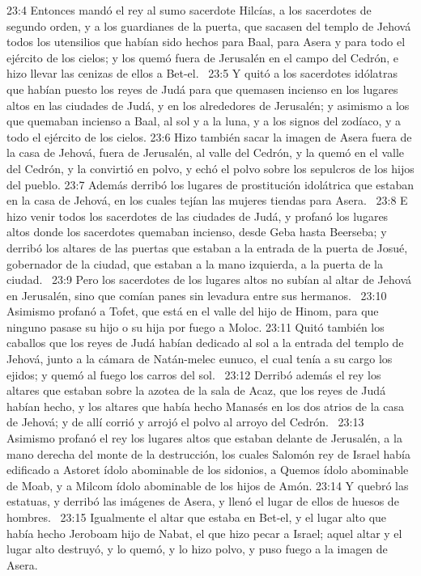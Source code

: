 23:4 Entonces mandó el rey al sumo sacerdote Hilcías, a los sacerdotes de segundo orden, y a los guardianes de la puerta, que sacasen del templo de Jehová todos los utensilios que habían sido hechos para Baal, para Asera y para todo el ejército de los cielos; y los quemó fuera de Jerusalén en el campo del Cedrón, e hizo llevar las cenizas de ellos a Bet-el.  
23:5 Y quitó a los sacerdotes idólatras que habían puesto los reyes de Judá para que quemasen incienso en los lugares altos en las ciudades de Judá, y en los alrededores de Jerusalén; y asimismo a los que quemaban incienso a Baal, al sol y a la luna, y a los signos del zodíaco, y a todo el ejército de los cielos. 
23:6 Hizo también sacar la imagen de Asera fuera de la casa de Jehová, fuera de Jerusalén, al valle del Cedrón, y la quemó en el valle del Cedrón, y la convirtió en polvo, y echó el polvo sobre los sepulcros de los hijos del pueblo. 
23:7 Además derribó los lugares de prostitución idolátrica que estaban en la casa de Jehová, en los cuales tejían las mujeres tiendas para Asera.  
23:8 E hizo venir todos los sacerdotes de las ciudades de Judá, y profanó los lugares altos donde los sacerdotes quemaban incienso, desde Geba hasta Beerseba; y derribó los altares de las puertas que estaban a la entrada de la puerta de Josué, gobernador de la ciudad, que estaban a la mano izquierda, a la puerta de la ciudad.  
23:9 Pero los sacerdotes de los lugares altos no subían al altar de Jehová en Jerusalén, sino que comían panes sin levadura entre sus hermanos.  
23:10 Asimismo profanó a Tofet, que está en el valle del hijo de Hinom, para que ninguno pasase su hijo o su hija por fuego a Moloc. 
23:11 Quitó también los caballos que los reyes de Judá habían dedicado al sol a la entrada del templo de Jehová, junto a la cámara de Natán-melec eunuco, el cual tenía a su cargo los ejidos; y quemó al fuego los carros del sol.  
23:12 Derribó además el rey los altares que estaban sobre la azotea de la sala de Acaz, que los reyes de Judá habían hecho, y los altares que había hecho Manasés en los dos atrios de la casa de Jehová; y de allí corrió y arrojó el polvo al arroyo del Cedrón.  
23:13 Asimismo profanó el rey los lugares altos que estaban delante de Jerusalén, a la mano derecha del monte de la destrucción, los cuales Salomón rey de Israel había edificado a Astoret ídolo abominable de los sidonios, a Quemos ídolo abominable de Moab, y a Milcom ídolo abominable de los hijos de Amón. 
23:14 Y quebró las estatuas, y derribó las imágenes de Asera, y llenó el lugar de ellos de huesos de hombres.  
23:15 Igualmente el altar que estaba en Bet-el, y el lugar alto que había hecho Jeroboam hijo de Nabat, el que hizo pecar a Israel; aquel altar y el lugar alto destruyó, y lo quemó, y lo hizo polvo, y puso fuego a la imagen de Asera.  
